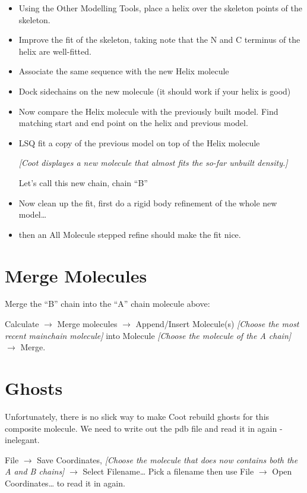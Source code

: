 \documentclass{article}
\begin{document}
\begin{itemize}
\item Using the Other Modelling Tools, place a helix over the skeleton
  points of the skeleton.
\item Improve the fit of the skeleton, taking note that the N and C
  terminus of the helix are well-fitted.
\item Associate the same sequence with the new Helix molecule
\item Dock sidechains on the new molecule (it should work if your
  helix is good)
\item Now compare the Helix molecule with the previously built model.
  Find matching start and end point on the helix and previous model.
\item LSQ fit a copy of the previous model on top of the Helix molecule

  \textsl{ [Coot displayes a new molecule that almost fits the so-far
    unbuilt density.]}

  Let's call this new chain, chain ``B''

\item Now clean up the fit, first do a rigid body refinement of the
  whole new model\ldots{}

\item then an All Molecule stepped refine should make the fit nice.

\end{itemize}


\section{Merge Molecules}

Merge the ``B'' chain into the ``A'' chain molecule above: 

\textsf{Calculate $\rightarrow$ Merge molecules $\rightarrow$
  Append/Insert Molecule(s) \emph{[Choose the most recent mainchain
    molecule]} into Molecule \emph{[Choose the molecule of the A chain]}
  $\rightarrow$ Merge}.

\section{Ghosts}

Unfortunately, there is no slick way to make Coot rebuild ghosts for
this composite molecule.  We need to write out the pdb file and read
it in again - inelegant.

\textsf{File $\rightarrow$ Save Coordinates, \emph{[Choose the
    molecule that does now contains both the A and B chains]}
  $\rightarrow$ Select Filename\ldots } Pick a filename then use
\textsf{File $\rightarrow$ Open Coordinates\ldots} to read it in
again.
\end{document}
